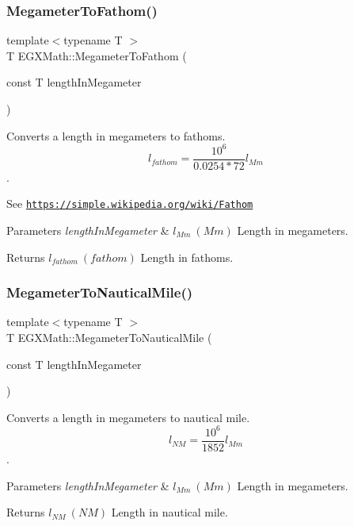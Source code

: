 \subsubsection{\texorpdfstring{Megameter\+To\+Fathom()}{MegameterToFathom()}}
{\footnotesize\ttfamily template$<$typename T $>$ \\
T E\+G\+X\+Math\+::\+Megameter\+To\+Fathom (\begin{DoxyParamCaption}\item[{const T}]{length\+In\+Megameter }\end{DoxyParamCaption})}



Converts a length in megameters to fathoms. \[ l_{fathom}= \frac{10^{6}}{0.0254 * 72} l_{Mm} \]. 

See \href{https://simple.wikipedia.org/wiki/Fathom}{\tt https\+://simple.\+wikipedia.\+org/wiki/\+Fathom} 
\begin{DoxyParams}{Parameters}
{\em length\+In\+Megameter} & $ l_{Mm}\ (Mm)$ Length in megameters. \\
\hline
\end{DoxyParams}
\begin{DoxyReturn}{Returns}
$ l_{fathom}\ (fathom)$ Length in fathoms. 
\end{DoxyReturn}
\mbox{\label{group___e_g_x_math-_conversions-_length_conversions-_s_i-_megameter-_nautical_ga483b575b1654e1d0f6ea1fac63b5f54e}} 
\subsubsection{\texorpdfstring{Megameter\+To\+Nautical\+Mile()}{MegameterToNauticalMile()}}
{\footnotesize\ttfamily template$<$typename T $>$ \\
T E\+G\+X\+Math\+::\+Megameter\+To\+Nautical\+Mile (\begin{DoxyParamCaption}\item[{const T}]{length\+In\+Megameter }\end{DoxyParamCaption})}



Converts a length in megameters to nautical mile. \[ l_{NM}= \frac{10^{6}}{1852} l_{Mm} \]. 


\begin{DoxyParams}{Parameters}
{\em length\+In\+Megameter} & $ l_{Mm}\ (Mm)$ Length in megameters. \\
\hline
\end{DoxyParams}
\begin{DoxyReturn}{Returns}
$ l_{NM}\ (NM)$ Length in nautical mile. 
\end{DoxyReturn}
